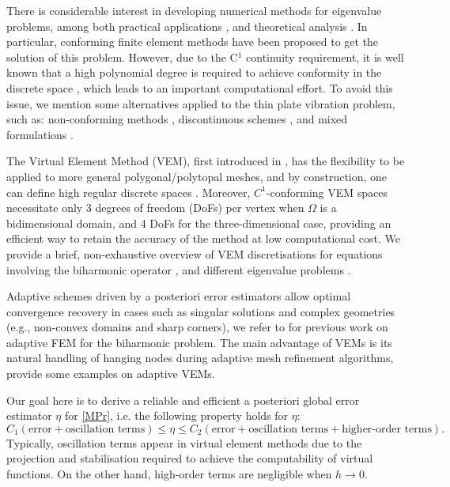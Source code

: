 \documentclass[final,reqno]{elsarticle}
\begin{document}
There is considerable interest in developing numerical methods for eigenvalue problems, among both practical applications \cite{BDMRS1995}, and theoretical analysis \cite{Boffi,BGG2012}. In particular, conforming finite element methods have been proposed to get the solution of this problem. However, due to the C$^1$ continuity requirement, it is well known that a high polynomial degree is required to achieve conformity in the discrete space \cite{ciarlet}, which leads to an important computational effort. To avoid this issue, we mention some alternatives applied to the thin plate vibration problem, such as: non-conforming methods \cite{BO,ciarlet,Ra}, discontinuous schemes \cite{ENGEL2002,GIANI2015}, and mixed formulations \cite{ciarlet1974mixed,monk1987,MoRo2009}.  

 The Virtual Element Method (VEM), first introduced in \cite{BBCMMR2013,BBMR2014}, has the flexibility to be applied to more general polygonal/polytopal meshes, and by construction, one can define high regular discrete spaces \cite{BM14}. Moreover, $C^1$-conforming VEM spaces necessitate only 3 degrees of freedom (DoFs) per vertex when $\Omega$ is a bidimensional domain, and 4 DoFs for the three-dimensional case, providing an efficient way to retain the accuracy of the method at low computational cost.  We provide a brief, non-exhaustive overview of VEM discretisations for equations involving the biharmonic operator \cite{ABSV2016,C1VEM_Polyhedral,BM13,MCS2021,MS2022}, and different eigenvalue problems \cite{gardini2,DV_camwa2022,gardini1,Meng2020,C0VEM2021,SteklovVEM2019,MRR2015,MV18,MVsiam2021,MRV2018}.

 Adaptive schemes driven by a posteriori error estimators allow optimal convergence recovery in cases such as singular solutions and complex geometries (e.g., non-convex domains and sharp corners), we refer to \cite{CARSTENSEN2024,feng2023,G2014,Li2018} for previous work on adaptive FEM for the biharmonic problem. The main advantage of VEMs is its natural handling of hanging nodes during adaptive mesh refinement algorithms, \cite{cangiani2017posteriori,dassi2025post,MORA2017,munar2024} provide some examples on adaptive VEMs.
 
 Our goal here is to derive a reliable and efficient a posteriori global error estimator $\eta$ for \eqref{MPr}, i.e. the following property holds for $\eta$: 
 $$C_1 (\text{error} + \text{oscillation terms}) \leq \eta \leq C_2 (\text{error}  + \text{oscillation terms} + \text{higher-order terms}).$$
 Typically, oscillation terms appear in virtual element methods due to the projection and stabilisation required to achieve the computability of virtual functions. On the other hand, high-order terms are negligible when $h\rightarrow 0$. 
\end{document}
